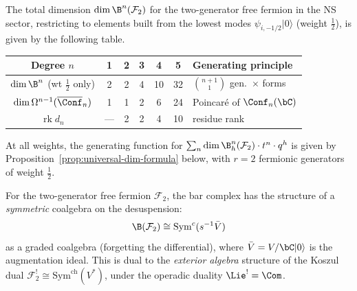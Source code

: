 \begin{computation}
\label{comp:fermion-dim-table}
The total dimension $\dim \B^n(\mathcal{F}_2)$ for the two-generator
free fermion in the NS sector, restricting to elements built
from the lowest modes $\psi_{i,-1/2}|0\rangle$ (weight $\tfrac{1}{2}$),
is given by the following table.

\begin{center}
\renewcommand{\arraystretch}{1.2}
\begin{tabular}{c|ccccc|l}
Degree $n$ & 1 & 2 & 3 & 4 & 5 & Generating principle \\
\hline
$\dim \B^n$ (wt $\frac{1}{2}$ only) & 2 & 2 & 4 & 10 & 32
  & $\binom{n+1}{1}$ gen.\ $\times$ forms \\
$\dim \Omega^{n-1}(\overline{\Conf}_n)$ & 1 & 1 & 2 & 6 & 24
  & Poincar\'{e} of $\Conf_n(\bC)$ \\
$\operatorname{rk} d_n$ & --- & 2 & 2 & 4 & 10 & residue rank
\end{tabular}
\end{center}

At all weights, the generating function for
$\sum_n \dim \B^n_h(\mathcal{F}_2) \cdot t^n \cdot q^h$ is given
by Proposition~\ref{prop:universal-dim-formula} below, with
$r = 2$ fermionic generators of weight $\frac{1}{2}$.
\end{computation}

\begin{proposition}
\label{prop:fermion-bar-symmetric}
For the two-generator free fermion $\mathcal{F}_2$, the bar complex
has the structure of a \emph{symmetric} coalgebra on the desuspension:
\begin{equation}\label{eq:fermion-bar-symcoalg}
\B(\mathcal{F}_2) \cong \mathrm{Sym}^c(s^{-1}\bar{V})
\end{equation}
as a graded coalgebra (forgetting the differential), where
$\bar{V} = V/\bC|0\rangle$ is the augmentation ideal.
This is dual to the \emph{exterior algebra} structure of the
Koszul dual $\mathcal{F}_2^! \cong
\mathrm{Sym}^{\mathrm{ch}}(V^*)$, under the operadic duality
$\Lie^! = \Com$.
\end{proposition}

